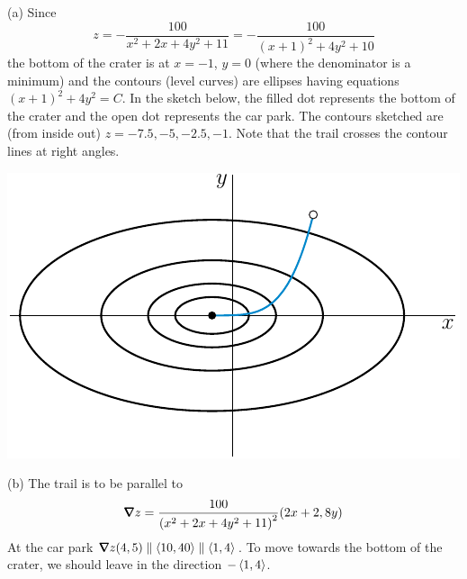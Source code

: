 \begin{solution}
(a)  Since
\begin{equation*}
z=-\frac{100}{x^2+2x+4y^2+11}=-\frac{100}{(x+1)^2+4y^2+10}
\end{equation*}
the bottom of the crater is at $x=-1$, $y=0$ (where the denominator is
a minimum) and the contours (level curves) are ellipses having equations
$(x+1)^2+4y^2=C$. In the sketch below, the filled dot represents the 
bottom of the crater and the open dot represents the car park. The 
contours sketched are (from inside out) $z=-7.5, -5, -2.5, -1$. Note that
the trail crosses the contour lines at right angles.

\begin{center}
     \includegraphics{fig/crater.pdf}
\end{center}

(b) The trail is to be parallel to 
$$
\vnabla z = \frac{100}{{(x^2+2x+4y^2+11)}^2}(2x+2,8y)
$$
At the car park $\vnabla z(4,5)\parallel \llt 10, 40\rgt\parallel \llt 1,4\rgt$.
To move towards the bottom of the crater, we should leave in the direction  
$-\left< 1,4\right>$.
\end{solution}

